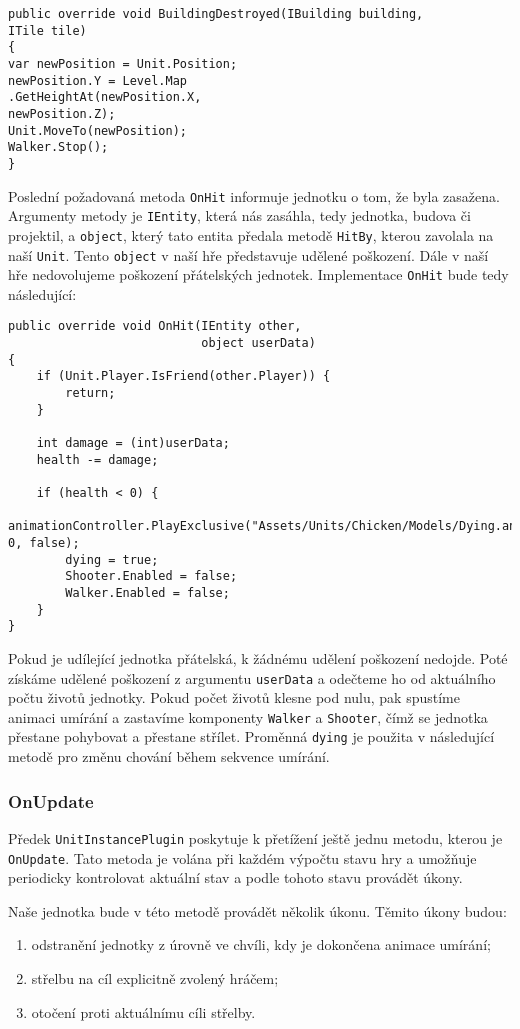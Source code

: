 \begin{lstlisting}
public override void BuildingDestroyed(IBuilding building, 
ITile tile)
{
var newPosition = Unit.Position;
newPosition.Y = Level.Map
.GetHeightAt(newPosition.X,
newPosition.Z);
Unit.MoveTo(newPosition);
Walker.Stop();
}
\end{lstlisting}

Poslední požadovaná metoda \texttt{OnHit} informuje jednotku o tom, že byla zasažena. Argumenty metody je \texttt{IEntity}, která nás zasáhla, tedy jednotka, budova či projektil, a \texttt{object}, který tato entita předala metodě \texttt{HitBy}, kterou zavolala na naší \texttt{Unit}. Tento \texttt{object} v naší hře představuje udělené poškození. Dále v naší hře nedovolujeme poškození přátelských jednotek. Implementace \texttt{OnHit} bude tedy následující:

\begin{lstlisting}
public override void OnHit(IEntity other, 
						   object userData)
{
	if (Unit.Player.IsFriend(other.Player)) {
		return;
	}

	int damage = (int)userData;
	health -= damage;

	if (health < 0) {
		animationController.PlayExclusive("Assets/Units/Chicken/Models/Dying.ani", 0, false);
		dying = true;
		Shooter.Enabled = false;
		Walker.Enabled = false;
	}
}
\end{lstlisting}

Pokud je udílející jednotka přátelská, k žádnému udělení poškození nedojde. Poté získáme udělené poškození z argumentu \texttt{userData} a odečteme ho od aktuálního počtu životů jednotky. Pokud počet životů klesne pod nulu, pak spustíme animaci umírání a zastavíme komponenty \texttt{Walker} a \texttt{Shooter}, čímž se jednotka přestane pohybovat a přestane střílet. Proměnná \texttt{dying} je použita v následující metodě pro změnu chování během sekvence umírání.

\subsubsection{OnUpdate}
Předek \texttt{UnitInstancePlugin} poskytuje k přetížení ještě jednu metodu, kterou je \texttt{OnUpdate}. Tato metoda je volána při každém výpočtu stavu hry a umožňuje periodicky kontrolovat aktuální stav a podle tohoto stavu provádět úkony.

Naše jednotka bude v této metodě provádět několik úkonu. Těmito úkony budou:
\begin{enumerate}
	\item odstranění jednotky z úrovně ve chvíli, kdy je dokončena animace umírání;
	\item střelbu na cíl explicitně zvolený hráčem;
	\item otočení proti aktuálnímu cíli střelby.
\end{enumerate}

